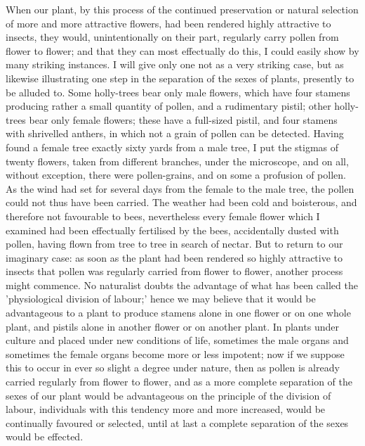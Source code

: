 \indent When our plant, by this process of the continued preservation or natural selection of more and more attractive flowers, had been rendered highly attractive to insects, they would, unintentionally on their part, regularly carry pollen from flower to flower; and that they can most effectually do this, I could easily show by many striking instances. I will give only one not as a very striking case, but as likewise illustrating one step in the separation of the sexes of plants, presently to be alluded to. Some holly-trees bear only male flowers, which have four stamens producing rather a small quantity of pollen, and a rudimentary pistil; other holly-trees bear only female flowers; these have a full-sized pistil, and four stamens with shrivelled anthers, in which not a grain of pollen can be detected. Having found a female tree exactly sixty yards from a male tree, I put the stigmas of twenty flowers, taken from different branches, under the microscope, and on all, without exception, there were pollen-grains, and on some a profusion of pollen. As the wind had set for several days from the female to the male tree, the pollen could not thus have been carried. The weather had been cold and boisterous, and therefore not favourable to bees, nevertheless every female flower which I examined had been effectually fertilised by the bees, accidentally dusted with pollen, having flown from tree to tree in search of nectar. But to return to our imaginary case: as soon as the plant had been rendered so highly attractive to insects that pollen was regularly carried from flower to flower, another process might commence. No naturalist doubts the advantage of what has been called the 'physiological division of labour;' hence we may believe that it would be advantageous to a plant to produce stamens alone in one flower or on one whole plant, and pistils alone in another flower or on another plant. In plants under culture and placed under new conditions of life, sometimes the male organs and sometimes the female organs become more or less impotent; now if we suppose this to occur in ever so slight a degree under nature, then as pollen is already carried regularly from flower to flower, and as a more complete separation of the sexes of our plant would be advantageous on the principle of the division of labour, individuals with this tendency more and more increased, would be continually favoured or selected, until at last a complete separation of the sexes would be effected. \\
